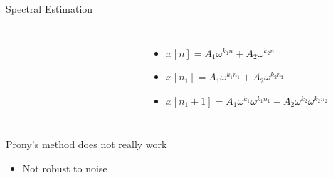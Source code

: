 \documentclass[10pt,xcolor=table]{beamer}
\begin{document}
\begin{frame}{Spectral Estimation}
	
        \begin{columns}		
		\begin{figure}
			\centering
			\scalebox{0.60}{}
		\end{figure}
		
		\begin{figure}
			\centering
			\scalebox{0.60}{}
		\end{figure}

        \begin{itemize}
        \item $x[n] = A_1 \omega^{k_1n} + A_2 \omega^{k_2 n}$
        \item $x[n_1] = A_1 \omega^{k_1n_1} + A_2 \omega^{k_2 n_2}$
        \item $x[n_1+1] =  A_1 \omega^{k_1} \omega^{k_1n_1} + A_2 \omega^{k_2} \omega^{k_2 n_2}$
		\end{itemize}
	\end{columns}	
\pause
\begin{block}{Prony's method does not really work}
\begin{itemize}
  \item Not robust to noise
\end{itemize}
\end{block}
\end{frame}
\end{document}

